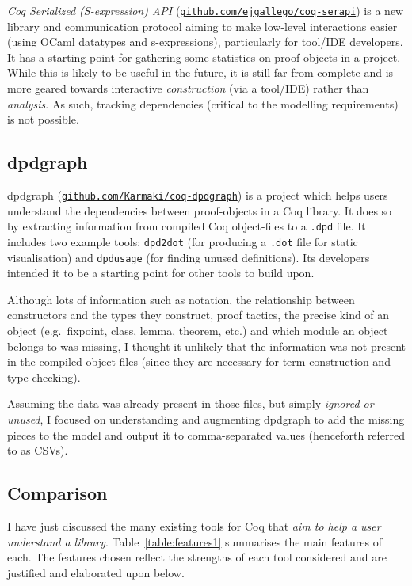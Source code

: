 \emph{Coq Serialized (S-expression) API}
(\href{http://github.com/ejgallego/coq-serapi}{\texttt{github.com/ejgallego/coq-serapi}})
is a new library and communication protocol aiming to make low-level
interactions easier (using OCaml datatypes and s-expressions), particularly for
tool/IDE developers. It has a starting point for gathering some statistics on
proof-objects in a project. While this is likely to be useful in the future, it
is still far from complete and is more geared towards interactive
\emph{construction} (via a tool/IDE) rather than \emph{analysis}. As such,
tracking dependencies (critical to the modelling requirements) is not possible.

\subsection{dpdgraph}

dpdgraph
(\href{http://github.com/Karmaki/coq-dpdgraph}{\texttt{github.com/Karmaki/coq-dpdgraph}})
is a project which helps users understand the dependencies between proof-objects
in a Coq library. It does so by extracting information from compiled Coq
object-files to a \texttt{.dpd} file. It includes two example tools:
\texttt{dpd2dot} (for producing a \texttt{.dot} file for static visualisation)
and \texttt{dpdusage} (for finding unused definitions). Its developers intended
it to be a starting point for other tools to build upon.

Although lots of information such as notation, the relationship between
constructors and the types they construct, proof tactics, the precise kind of an
object (e.g.\  fixpoint, class, lemma, theorem, etc.) and which module an object
belongs to was missing, I thought it unlikely that the information was not
present in the compiled object files (since they are necessary for
term-construction and type-checking).

Assuming the data was already present in those files, but simply \emph{ignored
or unused}, I focused on understanding and augmenting dpdgraph to add the
missing pieces to the model and output it to comma-separated values (henceforth
referred to as CSVs).

\subsection{Comparison}\label{subsec:comparison}

I have just discussed the many existing tools for Coq that \emph{aim to help a
user understand a library}. Table~\ref{table:features1} summarises the main
features of each. The features chosen reflect the strengths of each tool
considered and are justified and elaborated upon below. 

